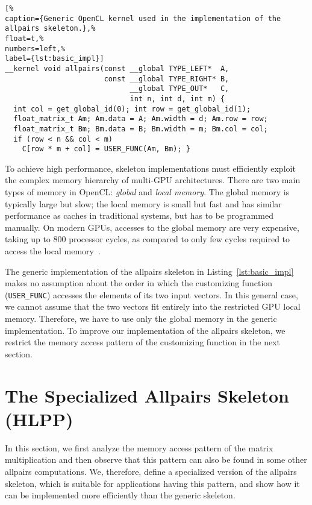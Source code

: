 \begin{lstlisting}[%                                                             
caption={Generic OpenCL kernel used in the implementation of the allpairs skeleton.},%
float=t,%                                                                       
numbers=left,%
label={lst:basic_impl}]
__kernel void allpairs(const __global TYPE_LEFT*  A,
                       const __global TYPE_RIGHT* B,
                             __global TYPE_OUT*   C,
                             int n, int d, int m) {
  int col = get_global_id(0); int row = get_global_id(1);
  float_matrix_t Am; Am.data = A; Am.width = d; Am.row = row;
  float_matrix_t Bm; Bm.data = B; Bm.width = m; Bm.col = col;
  if (row < n && col < m)
    C[row * m + col] = USER_FUNC(Am, Bm); }
\end{lstlisting}

To achieve high performance, skeleton implementations must efficiently exploit the complex memory hierarchy of multi-GPU architectures.
There are two main types of memory in OpenCL: \emph{global} and \emph{local memory}.
The global memory is typically large but slow; the local memory is small but fast and has similar performance as caches in traditional systems, but has to be programmed manually.
On modern GPUs, accesses to the global memory are very expensive, taking up to 800 processor cycles, as compared to only few cycles required to access the local memory~\cite{NVIDIA-12}.

The generic implementation of the allpairs skeleton in Listing~\ref{lst:basic_impl} makes no assumption about the order in which the customizing function (\texttt{USER\_FUNC}) accesses the elements of its two input vectors.
In this general case, we cannot assume that the two vectors fit entirely into the restricted GPU local memory.
Therefore, we have to use only the global memory in the generic implementation.
To improve our implementation of the allpairs skeleton, we restrict the memory access pattern of the customizing function in the next section.


\section{The Specialized Allpairs Skeleton (HLPP)}
\label{sec:opt_allpairs_skeleton}
In this section, we first analyze the memory access pattern of the matrix multiplication and then observe that this pattern can also be found in some other allpairs computations.
We, therefore, define a specialized version of the allpairs skeleton, which is suitable for applications having this pattern, and show how it can be implemented more efficiently than the generic skeleton.

